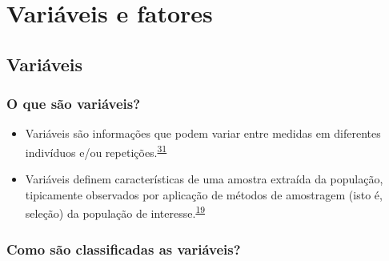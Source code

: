 \documentclass[
]{book}
\begin{document}
\hypertarget{variaveis-fatores}{%
\chapter{\texorpdfstring{\textbf{Variáveis e fatores}}{Variáveis e fatores}}\label{variaveis-fatores}}

\hypertarget{variaveis}{%
\section{Variáveis}\label{variaveis}}

\hypertarget{o-que-suxe3o-variuxe1veis}{%
\subsection{O que são variáveis?}\label{o-que-suxe3o-variuxe1veis}}

\begin{itemize}
\item
  Variáveis são informações que podem variar entre medidas em diferentes indivíduos e/ou repetições.\textsuperscript{\protect\hyperlink{ref-Altman1999}{31}}
\item
  Variáveis definem características de uma amostra extraída da população, tipicamente observados por aplicação de métodos de amostragem (isto é, seleção) da população de interesse.\textsuperscript{\protect\hyperlink{ref-vetter2017}{19}}
\end{itemize}

\hypertarget{como-suxe3o-classificadas-as-variuxe1veis}{%
\subsection{Como são classificadas as variáveis?}\label{como-suxe3o-classificadas-as-variuxe1veis}}
\end{document}
